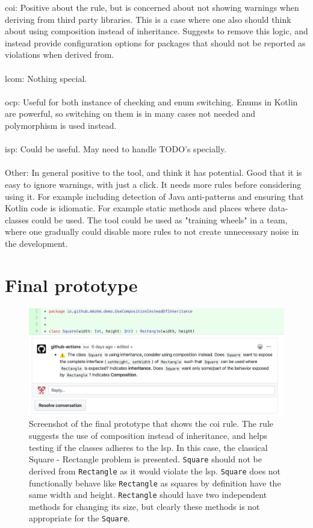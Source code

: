 \noindent \gls{coi}: Positive about the rule, but is concerned about not showing warnings when deriving from third party libraries. This is a case where one also should think about using composition instead of inheritance. Suggests to remove this logic, and instead provide configuration options for packages that should not be reported as violations when derived from.  \\\\

\noindent \gls{lcom}: Nothing special. \\\\

\noindent \gls{ocp}: Useful for both instance of checking and enum switching. Enums in Kotlin are powerful, so switching on them is in many cases not needed and polymorphism is used instead.\\\\

\noindent \gls{isp}: Could be useful. May need to handle TODO's specially. \\\\

\noindent Other: In general positive to the tool, and think it has potential. Good that it is easy to ignore warnings, with just a click. It needs more rules before considering using it. For example including detection of Java anti-patterns and ensuring that Kotlin code is idiomatic. For example static methods and places where data-classes could be used. The tool could be used as "training wheels" in a team, where one gradually could disable more rules to not create unnecessary noise in the development.

\clearpage
\section{Final prototype}
\label{final-artifact}
\begin{figure}[h!]
    \centering
    \includegraphics[width=\textwidth]{images/final_coh.png}
    \caption{Screenshot of the final prototype that shows the \gls{coi} rule. The rule suggests the use of composition instead of inheritance, and helps testing if the classes adheres to the \gls{lsp}. In this case, the classical Square - Rectangle problem is presented. \texttt{Square} should not be derived from \texttt{Rectangle} as it would violate the \gls{lsp}. \texttt{Square} does not functionally behave like \texttt{Rectangle} as squares by definition have the same width and height. \texttt{Rectangle} should have two independent methods for changing its size, but clearly these methods is not appropriate for the \texttt{Square}.}
\end{figure}

